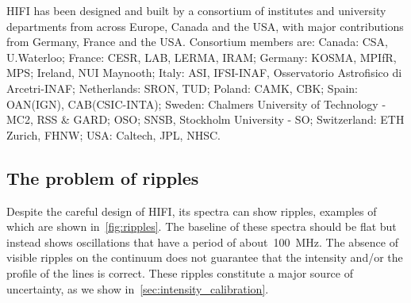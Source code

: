 HIFI has been designed and built by a consortium of institutes and university departments from across Europe, Canada and the USA, with major contributions from Germany, France and the USA. Consortium members are: Canada: CSA, U.Waterloo; France: CESR, LAB, LERMA, IRAM; Germany: KOSMA, MPIfR, MPS; Ireland, NUI Maynooth; Italy: ASI, IFSI-INAF, Osservatorio Astrofisico di Arcetri-INAF; Netherlands: SRON, TUD; Poland: CAMK, CBK; Spain: OAN(IGN), CAB(CSIC-INTA); Sweden: Chalmers University of Technology - MC2, RSS \& GARD; OSO; SNSB, Stockholm University - SO; Switzerland: ETH Zurich, FHNW; USA: Caltech, JPL, NHSC.



\subsection{The problem of ripples}

Despite the careful design of HIFI,
its spectra can show ripples, examples of which are shown in~\cref{fig:ripples}.
The baseline of these spectra should be flat but instead shows oscillations that have a period of about~\SI{100}{\mega\hertz}.
The absence of visible ripples on the continuum does not guarantee that the intensity and/or the profile of the lines is correct.
These ripples constitute a major source of uncertainty, as we show in~\cref{sec:intensity_calibration}.

